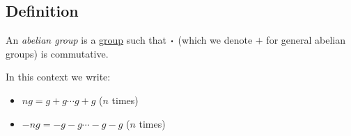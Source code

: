 \subsection{Definition}\label{abeliangroupdefinition}

An \emph{abelian group} is a \hyperref[groupodefinition]{group} such that $\LargerCdot$ (which we denote $+$ for general abelian groups) is commutative.\newline

\noindent In this context we write:
\begin{itemize}
  \item $ng = g + g \cdots g + g$ ($n$ times)
  \item $-ng = - g - g \cdots - g - g$ ($n$ times)
\end{itemize} 